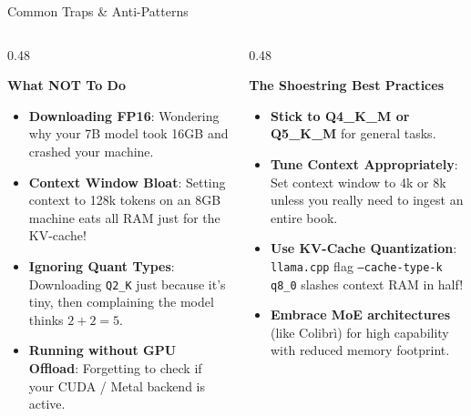 \documentclass[10pt,aspectratio=169]{beamer}
\begin{document}
\begin{frame}{Common Traps \& Anti-Patterns}
    \begin{columns}[T]
        \begin{column}{0.48\textwidth}
            \begin{alertblock}{\textbf{What NOT To Do}}
                \begin{itemize}
                    \item \textbf{Downloading FP16}: Wondering why your 7B model took 16GB and crashed your machine.
                    \item \textbf{Context Window Bloat}: Setting context to 128k tokens on an 8GB machine eats all RAM just for the KV-cache!
                    \item \textbf{Ignoring Quant Types}: Downloading \texttt{Q2\_K} just because it's tiny, then complaining the model thinks $2+2=5$.
                    \item \textbf{Running without GPU Offload}: Forgetting to check if your CUDA / Metal backend is active.
                \end{itemize}
            \end{alertblock}
        \end{column}
        \begin{column}{0.48\textwidth}
            \begin{exampleblock}{\textbf{The Shoestring Best Practices}}
                \begin{itemize}
                    \item \textbf{Stick to Q4\_K\_M or Q5\_K\_M} for general tasks.
                    \item \textbf{Tune Context Appropriately}: Set context window to 4k or 8k unless you really need to ingest an entire book.
                    \item \textbf{Use KV-Cache Quantization}: \texttt{llama.cpp} flag \texttt{--cache-type-k q8\_0} slashes context RAM in half!
                    \item \textbf{Embrace MoE architectures} (like Colibr\`i) for high capability with reduced memory footprint.
                \end{itemize}
            \end{exampleblock}
        \end{column}
    \end{columns}
\end{frame}
\end{document}
